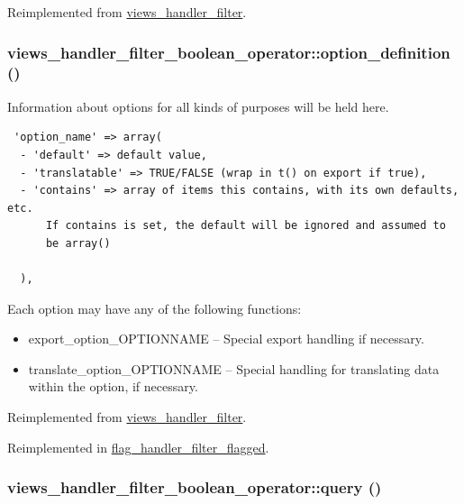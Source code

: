 Reimplemented from \hyperlink{classviews__handler__filter_8c77c0a8bba8c3ceceae8950fc7b1121}{views\_\-handler\_\-filter}.\hypertarget{classviews__handler__filter__boolean__operator_f2103bf9a481a2a2eb4d5c0e6baf2b77}{
\subsubsection[{option\_\-definition}]{\setlength{\rightskip}{0pt plus 5cm}views\_\-handler\_\-filter\_\-boolean\_\-operator::option\_\-definition ()}}
\label{classviews__handler__filter__boolean__operator_f2103bf9a481a2a2eb4d5c0e6baf2b77}


Information about options for all kinds of purposes will be held here. 

\begin{Code}\begin{verbatim} 'option_name' => array(
  - 'default' => default value,
  - 'translatable' => TRUE/FALSE (wrap in t() on export if true),
  - 'contains' => array of items this contains, with its own defaults, etc.
      If contains is set, the default will be ignored and assumed to
      be array()

  ),
\end{verbatim}
\end{Code}

 Each option may have any of the following functions:\begin{itemize}
\item export\_\-option\_\-OPTIONNAME -- Special export handling if necessary.\item translate\_\-option\_\-OPTIONNAME -- Special handling for translating data within the option, if necessary. \end{itemize}


Reimplemented from \hyperlink{classviews__handler__filter_053c9173084f1409a92eb390854ec304}{views\_\-handler\_\-filter}.

Reimplemented in \hyperlink{classflag__handler__filter__flagged_c840d3d9514263a5645c551c15e1daf2}{flag\_\-handler\_\-filter\_\-flagged}.\hypertarget{classviews__handler__filter__boolean__operator_b3afc650701939c060e684d75fa2b21b}{
\subsubsection[{query}]{\setlength{\rightskip}{0pt plus 5cm}views\_\-handler\_\-filter\_\-boolean\_\-operator::query ()}}
\label{classviews__handler__filter__boolean__operator_b3afc650701939c060e684d75fa2b21b}


